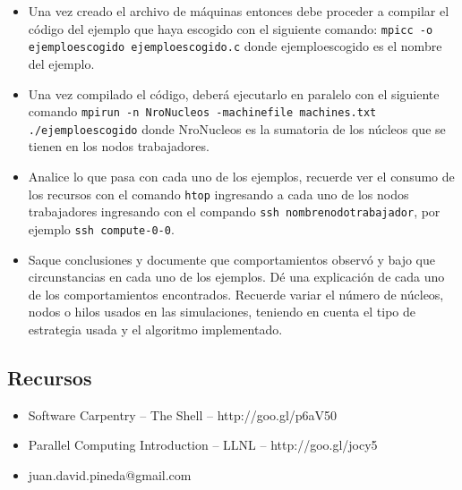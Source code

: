 \documentclass[12pt]{article}
\begin{document}
\begin{enumerate}
\begin{itemize}
  \item Una vez creado el archivo de máquinas entonces debe proceder a compilar el código del ejemplo que haya escogido con el siguiente comando: \texttt{mpicc -o ejemploescogido ejemploescogido.c} donde ejemploescogido es el nombre del ejemplo.
  \item Una vez compilado el código, deberá ejecutarlo en paralelo con el siguiente comando \texttt{mpirun -n NroNucleos -machinefile machines.txt ./ejemploescogido} donde NroNucleos es la sumatoria de los núcleos que se tienen en los nodos trabajadores.
  \item Analice lo que pasa con cada uno de los ejemplos, recuerde ver el consumo de los recursos con el comando \texttt{htop} ingresando a cada uno de los nodos trabajadores ingresando con el compando \texttt{ssh nombrenodotrabajador}, por ejemplo \texttt{ssh compute-0-0}.
  \item Saque conclusiones y documente que comportamientos observó y bajo que circunstancias en cada uno de los ejemplos. Dé una explicación de cada uno de los comportamientos encontrados. Recuerde variar el número de núcleos, nodos o hilos usados en las simulaciones, teniendo en cuenta el tipo de estrategia usada y el algoritmo implementado.
  \end{itemize}
\end{enumerate}

\subsection{Recursos}
\begin{itemize}
\item Software Carpentry -- The Shell -- http://goo.gl/p6aV50
\item Parallel Computing Introduction -- LLNL -- http://goo.gl/jocy5
\item juan.david.pineda@gmail.com
\end{itemize}
\end{document}
